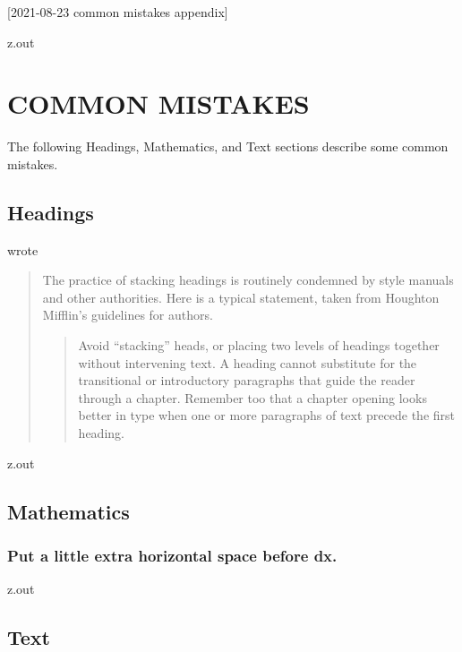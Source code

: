 [2021-08-23 common mistakes appendix]

\begin{VerbatimOut}{z.out}
\chapter{COMMON MISTAKES}

The following Headings, Mathematics, and Text
sections describe some common mistakes.


\section{Headings}

{\textcite[page~289]{farkas2011} }%
{\cite{farkas2011} }%
wrote

\begin{quotation}
  The practice of stacking headings
  is routinely condemned by style manuals
  and other authorities.
  Here is a typical statement,
  taken from Houghton Mifflin's guidelines for authors.
  \begin{quotation}
    Avoid ``stacking'' heads,
    or placing two levels
    of headings together without intervening text.
    A heading cannot substitute
    for the transitional
    or introductory paragraphs
    that guide the reader through a chapter.
    Remember too that a chapter opening looks better in type
    when one
    or more paragraphs
    of text precede the first heading.
  \end{quotation}
\end{quotation}
\end{VerbatimOut}

\MyIO

\begin{VerbatimOut}{z.out}


\section{Mathematics}

\subsection{Put a little extra horizontal space before dx.}
\end{VerbatimOut}
\MyIO


\begin{VerbatimOut}{z.out}


\section{Text}
\end{VerbatimOut}

